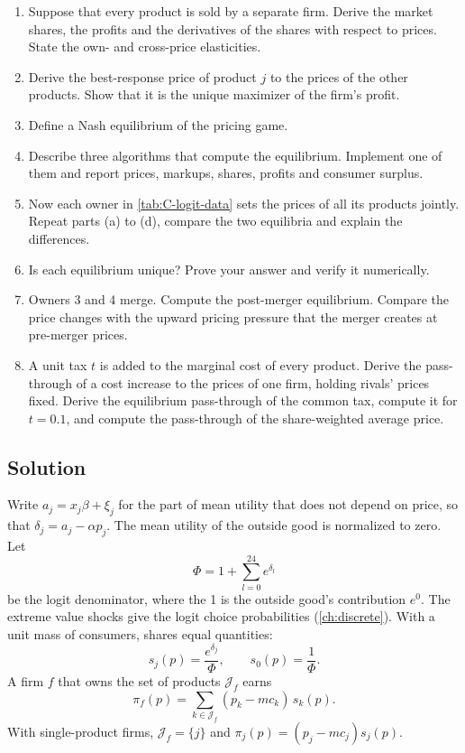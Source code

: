 \begin{enumerate}[label=(\alph*)]
  \item Suppose that every product is sold by a separate firm. Derive the market shares, the profits and the
  derivatives of the shares with respect to prices. State the own- and cross-price elasticities.
  \item Derive the best-response price of product $j$ to the prices of the other products. Show that it is the
  unique maximizer of the firm's profit.
  \item Define a Nash equilibrium of the pricing game.
  \item Describe three algorithms that compute the equilibrium. Implement one of them and report prices, markups,
  shares, profits and consumer surplus.
  \item Now each owner in \cref{tab:C-logit-data} sets the prices of all its products jointly. Repeat parts (a) to
  (d), compare the two equilibria and explain the differences.
  \item Is each equilibrium unique? Prove your answer and verify it numerically.
  \item Owners 3 and 4 merge. Compute the post-merger equilibrium. Compare the price changes with the upward
  pricing pressure that the merger creates at pre-merger prices.
  \item A unit tax $t$ is added to the marginal cost of every product. Derive the pass-through of a cost increase to
  the prices of one firm, holding rivals' prices fixed. Derive the equilibrium pass-through of the common tax,
  compute it for $t = 0.1$, and compute the pass-through of the share-weighted average price.
\end{enumerate}

\subsection{Solution}

Write $a_j = x_j\beta + \xi_j$ for the part of mean utility that does not depend on price, so that
$\delta_j = a_j - \alpha p_j$. The mean utility of the outside good is normalized to zero. Let
\begin{equation}\label{eq:C-logit-Phi}
  \Phi = 1 + \sum_{l=0}^{24} e^{\delta_l}
\end{equation}
be the logit denominator, where the 1 is the outside good's contribution $e^0$. The extreme value shocks give the
logit choice probabilities (\cref{ch:discrete}). With a unit mass of consumers, shares equal quantities:
\begin{equation}\label{eq:C-logit-shares}
  s_j(p) = \frac{e^{\delta_j}}{\Phi} , \qquad s_0(p) = \frac{1}{\Phi} .
\end{equation}
A firm $f$ that owns the set of products $\mathcal{J}_f$ earns
\begin{equation}\label{eq:C-logit-profit}
  \pi_f(p) = \sum_{k \in \mathcal{J}_f}(p_k - mc_k)\,s_k(p) .
\end{equation}
With single-product firms, $\mathcal{J}_f = \{j\}$ and $\pi_j(p) = (p_j - mc_j)s_j(p)$.

